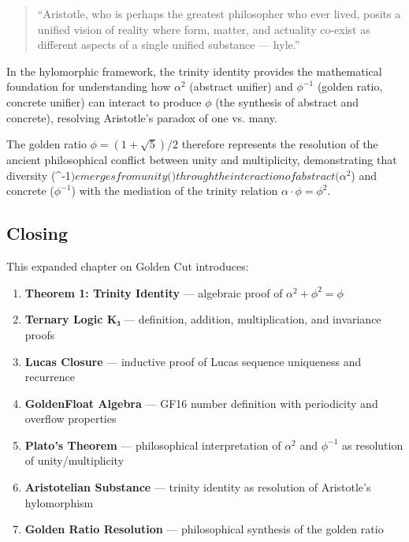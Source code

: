 \begin{theorem}
\begin{quote}
	``Aristotle, who is perhaps the greatest philosopher who ever lived, posits a unified vision of reality where form, matter, and actuality co-exist as different aspects of a single unified substance — hyle.''
	\end{quote}

\begin{theorem}
	\label{thm:aristotelian-substance}
	In the hylomorphic framework, the trinity identity provides the mathematical foundation for understanding how $\alpha^2$ (abstract unifier) and $\phi^{-1}$ (golden ratio, concrete unifier) can interact to produce $\phi$ (the synthesis of abstract and concrete), resolving Aristotle's paradox of one vs. many.
	\end{theorem}

\begin{corollary}
	\label{cor:golden-resolution}
	The golden ratio $\phi = (1+\sqrt{5})/2$ therefore represents the resolution of the ancient philosophical conflict between unity and multiplicity, demonstrating that diversity (\phi^{-1}$) emerges from unity ($\phi$) through the interaction of abstract (\alpha^2$) and concrete ($\phi^{-1}$) with the mediation of the trinity relation $\alpha \cdot \phi = \phi^2$.
	\end{corollary}

\subsection{Closing}

	This expanded chapter on Golden Cut introduces:

	\begin{enumerate}
		\item \textbf{Theorem 1: Trinity Identity} — algebraic proof of $\alpha^2 + \phi^2 = \phi$
		\item \textbf{Ternary Logic K₃} — definition, addition, multiplication, and invariance proofs
		\item \textbf{Lucas Closure} — inductive proof of Lucas sequence uniqueness and recurrence
		\item \textbf{GoldenFloat Algebra} — GF16 number definition with periodicity and overflow properties
		\item \textbf{Plato's Theorem} — philosophical interpretation of $\alpha^2$ and $\phi^{-1}$ as resolution of unity/multiplicity
		\item \textbf{Aristotelian Substance} — trinity identity as resolution of Aristotle's hylomorphism
		\item \textbf{Golden Ratio Resolution} — philosophical synthesis of the golden ratio
	\end{enumerate}


\end{theorem}
